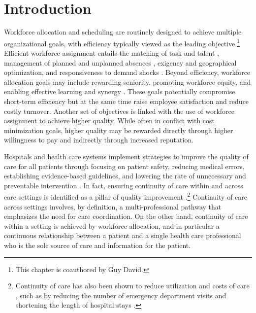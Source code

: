 \documentclass[final,12pt, notitlepage]{article}
\begin{document}
\newpage
\section{Introduction}


Workforce allocation and scheduling are routinely designed to achieve multiple organizational goals, with efficiency typically viewed as the leading objective.\footnote{This chapter is coauthored by Guy David.} Efficient workforce assignment entails the matching of task and talent \citep{Garicano2004}, management of planned and unplanned absences \citep{Ehrenberg1970, Allen1983}, exigency and geographical optimization, and responsiveness to demand shocks \citep{Hamermesh1996}.
Beyond efficiency, workforce allocation goals may include rewarding seniority, promoting workforce equity, and enabling effective learning and synergy \citep{Mas2009}. These goals potentially compromise short-term efficiency but at the same time raise employee satisfaction and reduce costly turnover. Another set of objectives is linked with the use of workforce assignment to achieve higher quality. While often in conflict with cost minimization goals, higher quality may be rewarded directly through higher willingness to pay and indirectly through increased reputation.



Hospitals and health care systems implement strategies to improve the quality of care for all patients through focusing on patient safety, reducing medical errors, establishing evidence-based guidelines, and lowering the rate of unnecessary and preventable intervention \citep{Kozak2001, Makary2016}.
In fact, ensuring continuity of care within and across care settings is identified as a pillar of quality improvement \citep{Richardson2001}.\footnote{Continuity of care has also been shown to reduce utilization and costs of care \citep{Raddish1999}, such as by reducing the number of emergency department visits and shortening the length of hospital stays \citep{Wasson1984}.}
Continuity of care across settings involves, by definition, a multi-professional pathway that emphasizes the need for care coordination. On the other hand, continuity of care within a setting is achieved by workforce allocation, and in particular a continuous relationship between a patient and a single health care professional who is the sole source of care and information for the patient. 
\end{document}

